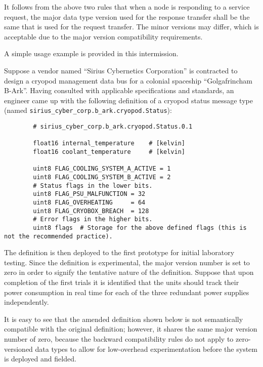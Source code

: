 It follows from the above two rules that when a node is responding to a service request,
the major data type version used for the response transfer shall be the same that is used for the request transfer.
The minor versions may differ, which is acceptable due to the major version compatibility requirements.

\begin{remark}[breakable]
    A simple usage example is provided in this intermission.

    Suppose a vendor named ``Sirius Cybernetics Corporation'' is contracted to design a
    cryopod management data bus for a colonial spaceship ``Golgafrincham B-Ark''.
    Having consulted with applicable specifications and standards, an engineer came up with the following
    definition of a cryopod status message type (named \verb|sirius_cyber_corp.b_ark.cryopod.Status|):

    \begin{verbatim}
        # sirius_cyber_corp.b_ark.cryopod.Status.0.1

        float16 internal_temperature    # [kelvin]
        float16 coolant_temperature     # [kelvin]

        uint8 FLAG_COOLING_SYSTEM_A_ACTIVE = 1
        uint8 FLAG_COOLING_SYSTEM_B_ACTIVE = 2
        # Status flags in the lower bits.
        uint8 FLAG_PSU_MALFUNCTION = 32
        uint8 FLAG_OVERHEATING     = 64
        uint8 FLAG_CRYOBOX_BREACH  = 128
        # Error flags in the higher bits.
        uint8 flags  # Storage for the above defined flags (this is not the recommended practice).
    \end{verbatim}

    The definition is then deployed to the first prototype for initial laboratory testing.
    Since the definition is experimental, the major version number is set to zero in order to signify the
    tentative nature of the definition.
    Suppose that upon completion of the first trials it is identified that the units should track their
    power consumption in real time for each of the three redundant power supplies independently.

    It is easy to see that the amended definition shown below is not semantically compatible
    with the original definition; however, it shares the same major version number of zero, because the backward
    compatibility rules do not apply to zero-versioned data types to allow for low-overhead experimentation
    before the system is deployed and fielded.


\end{remark}
